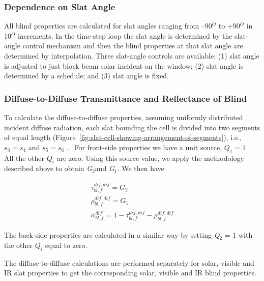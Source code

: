 \subsubsection{Dependence on Slat Angle}\label{dependence-on-slat-angle}

All blind properties are calculated for slat angles ranging from --90\(^{O}\) to +90\(^{O}\) in 10\(^{O}\) increments. In the time-step loop the slat angle is determined by the slat-angle control mechanism and then the blind properties at that slat angle are determined by interpolation. Three slat-angle controls are available: (1) slat angle is adjusted to just block beam solar incident on the window; (2) slat angle is determined by a schedule; and (3) slat angle is fixed.

\subsubsection{Diffuse-to-Diffuse Transmittance and Reflectance of Blind}\label{diffuse-to-diffuse-transmittance-and-reflectance-of-blind}

To calculate the diffuse-to-diffuse properties, assuming uniformly distributed incident diffuse radiation, each slat bounding the cell is divided into two segments of equal length (Figure~\ref{fig:slat-cell-showing-arrangement-of-segments}), i.e., \({s_3} = {s_4}\) and \({s_5} = {s_6}\) .~ For front-side properties we have a unit source, \({Q_1} = 1\) .~ All the other \({Q_i}\) are zero. Using this source value, we apply the methodology described above to obtain \emph{G\(_{2}\)}and \emph{G\(_{1}\)}. We then have

\begin{equation}
\begin{array}{l}\tau_{bl,f}^{dif,dif} = {G_2}\\\rho_{bl,f}^{dif,dif} = {G_1}\\\alpha_{bl,f}^{dif} = 1 - \tau_{bl,f}^{dif,dif} - \rho_{bl,f}^{dif,dif}\end{array}
\end{equation}

The back-side properties are calculated in a similar way by setting \emph{Q\(_{2}\)} = 1 with the other \({Q_i}\) equal to zero.

The diffuse-to-diffuse calculations are performed separately for solar, visible and IR slat properties to get the corresponding solar, visible and IR blind properties.

